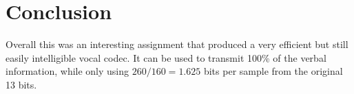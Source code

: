 \documentclass[]{article}
\begin{document}
\section{Conclusion}
Overall this was an interesting assignment that produced a very efficient but still easily intelligible vocal codec. It can be used to transmit 100\% of the verbal information, while only using $260/160=1.625$ bits per sample from the original 13 bits.

\printbibliography
\end{document}
